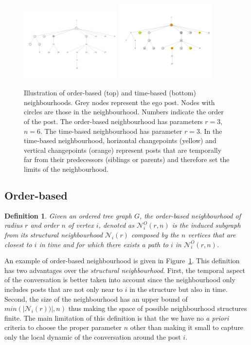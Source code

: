 \documentclass[conference]{IEEEtran}
\newtheorem{definition}{Definition}
\begin{document}
\begin{figure}
\centering
\includegraphics[width=0.45\textwidth]{order_neighbourhood}
\includegraphics[width=0.45\textwidth]{breakpoints}
\caption{Illustration of order-based (top) and time-based (bottom) neighbourhoods. Grey nodes represent the ego post. Nodes with circles are those in the neighbourhood. Numbers indicate the order of the post. The order-based neighbourhood has parameters $r=3$, $n=6$. The time-based neighbourhood has parameter $r=3$. In the time-based neighbourhood, horizontal changepoints (yellow) and vertical changepoints (orange) represent posts that are temporally far from their predecessors (siblings or parents) and therefore set the limits of the neighbourhood.}
\label{fig:cutpoints}
\end{figure}
\subsection{Order-based}
\begin{definition}
Given an ordered tree graph $G$, the \textit{order-based neighbourhood} of radius $r$ and order $n$ of vertex $i$, denoted as $\mathcal{N}_{i}^O(r,n)$ is the induced subgraph from its structural neighbourhood $\mathcal{N}_{i}(r)$ composed by the $n$ vertices that are closest to $i$ in time and for which there exists a path to $i$ in $\mathcal{N}_{i}^O(r,n)$.  
\end{definition}
An example of order-based neighbourhood is given in Figure~\ref{fig:cutpoints}.
This definition has two advantages over the \textit{structural neighbourhood}. First, the temporal aspect of the conversation is better taken into account since the neighbourhood only includes posts that are not only near to $i$ in the structure but also in time. Second, the size of the neighbourhood has an upper bound of $min(|\mathcal{N}_i(r))|, n)$ thus making the space of possible neighbourhood structures finite. The main limitation of this definition is that the we have no \textit{a priori} criteria to choose the proper parameter $n$ other than making it small to capture only the local dynamic of the conversation around the post $i$.
\end{document}
